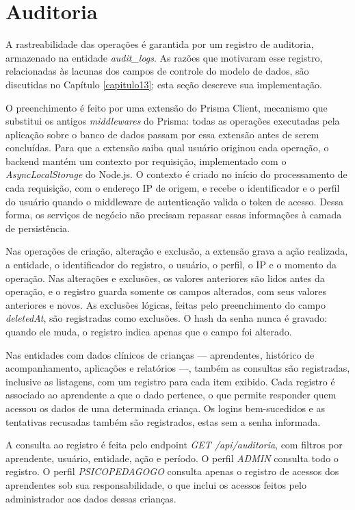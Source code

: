 \section{Auditoria}

A rastreabilidade das operações é garantida por um registro de auditoria, armazenado na entidade \textit{audit\_logs}. As razões que motivaram esse registro, relacionadas às lacunas dos campos de controle do modelo de dados, são discutidas no Capítulo \ref{capitulo13}; esta seção descreve sua implementação.

O preenchimento é feito por uma extensão do Prisma Client, mecanismo que substitui os antigos \textit{middlewares} do Prisma: todas as operações executadas pela aplicação sobre o banco de dados passam por essa extensão antes de serem concluídas. Para que a extensão saiba qual usuário originou cada operação, o backend mantém um contexto por requisição, implementado com o \textit{AsyncLocalStorage} do Node.js. O contexto é criado no início do processamento de cada requisição, com o endereço IP de origem, e recebe o identificador e o perfil do usuário quando o middleware de autenticação valida o token de acesso. Dessa forma, os serviços de negócio não precisam repassar essas informações à camada de persistência.

Nas operações de criação, alteração e exclusão, a extensão grava a ação realizada, a entidade, o identificador do registro, o usuário, o perfil, o IP e o momento da operação. Nas alterações e exclusões, os valores anteriores são lidos antes da operação, e o registro guarda somente os campos alterados, com seus valores anteriores e novos. As exclusões lógicas, feitas pelo preenchimento do campo \textit{deletedAt}, são registradas como exclusões. O hash da senha nunca é gravado: quando ele muda, o registro indica apenas que o campo foi alterado.

Nas entidades com dados clínicos de crianças — aprendentes, histórico de acompanhamento, aplicações e relatórios —, também as consultas são registradas, inclusive as listagens, com um registro para cada item exibido. Cada registro é associado ao aprendente a que o dado pertence, o que permite responder quem acessou os dados de uma determinada criança. Os logins bem-sucedidos e as tentativas recusadas também são registrados, estas sem a senha informada.

A consulta ao registro é feita pelo endpoint \textit{GET /api/auditoria}, com filtros por aprendente, usuário, entidade, ação e período. O perfil \textit{ADMIN} consulta todo o registro. O perfil \textit{PSICOPEDAGOGO} consulta apenas o registro de acessos dos aprendentes sob sua responsabilidade, o que inclui os acessos feitos pelo administrador aos dados dessas crianças.

